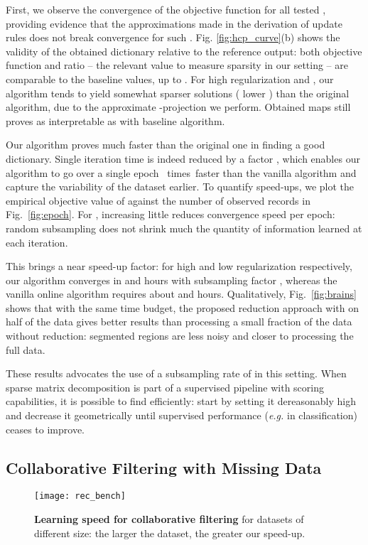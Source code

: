 \documentclass{article}
\begin{document}
First, we observe the convergence of the objective
function for all tested , providing evidence that the approximations made in the derivation of update rules does not break convergence for such .
Fig. \ref{fig:hcp_curve}(b) shows the validity of the
obtained dictionary relative to the reference output: both objective function
and  ratio -- the relevant value to measure sparsity in our setting -- are comparable to the baseline values, up to . For high regularization and , our algorithm
 tends to yield somewhat sparser solutions
 ( lower ) than the original algorithm, due to the approximate -projection we perform. Obtained maps still proves as interpretable as with baseline algorithm.

Our algorithm proves much faster than the original
one in finding a good dictionary. Single iteration time is indeed reduced by a
factor , which enables our algorithm to go over a single epoch ~times~faster
than the vanilla algorithm and capture the variability of
the dataset earlier. To quantify speed-ups, we plot the empirical
objective value of  against the number of observed records in Fig.~\ref{fig:epoch}. For , increasing  little reduces convergence
speed per epoch: random subsampling does not shrink much the quantity of information learned at each iteration.

This brings a near  speed-up factor: for high and low regularization respectively, our algorithm converges in  and  hours with subsampling factor , whereas
the vanilla online algorithm requires about  and  hours.
Qualitatively, Fig.~\ref{fig:brains} shows that with the same time
budget, the proposed reduction approach with  on half of the data
gives better results than processing a small fraction of the data without
reduction: segmented regions are less noisy and closer to processing the full data.

These results advocates the use of a subsampling rate of  in this
setting. When sparse matrix decomposition is part of a supervised pipeline with
scoring capabilities, it is possible to find  efficiently: start by setting
it dereasonably high and decrease it geometrically until supervised performance
(\textit{e.g.} in classification) ceases to improve.

\subsection{Collaborative Filtering with Missing Data}

\begin{figure*}[ht]
  \centering
  \texttt{[image: rec\_bench]}
  \vspace{-2em}
  \caption{\textbf{Learning speed for collaborative filtering}
for datasets of different size: the larger the dataset, the greater
our speed-up.
  \label{fig:bench_rec}}
\end{figure*}
\end{document}
